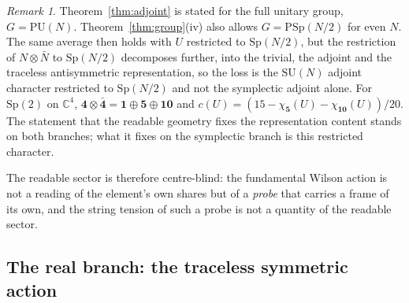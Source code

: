 \documentclass[11pt,a4paper]{article}
\theoremstyle{plain}
\theoremstyle{definition}
\theoremstyle{remark}
\newtheorem*{remark}{Remark}
\newcommand{\C}{\mathbb{C}}
\newcommand{\SU}{\mathrm{SU}}
\newcommand{\PU}{\mathrm{PU}}
\newcommand{\PSp}{\mathrm{PSp}}
\newcommand{\Sp}{\mathrm{Sp}}
\begin{document}
\begin{remark}
Theorem~\ref{thm:adjoint} is stated for the full unitary group, $G=\PU(N)$. Theorem~\ref{thm:group}(iv) also allows $G=\PSp(N/2)$ for even $N$. The same average then holds with $U$ restricted to $\Sp(N/2)$, but the restriction of $N\otimes\bar N$ to $\Sp(N/2)$ decomposes further, into the trivial, the adjoint and the traceless antisymmetric representation, so the loss is the $\SU(N)$ adjoint character restricted to $\Sp(N/2)$ and not the symplectic adjoint alone. For $\Sp(2)$ on $\C^4$, $\mathbf4\otimes\bar{\mathbf4}=\mathbf1\oplus\mathbf5\oplus\mathbf{10}$ and $c(U)=(15-\chi_{\mathbf5}(U)-\chi_{\mathbf{10}}(U))/20$. The statement that the readable geometry fixes the representation content stands on both branches; what it fixes on the symplectic branch is this restricted character.
\end{remark}

The readable sector is therefore centre-blind: the fundamental Wilson action is not a reading of the element's own shares but of a \emph{probe} that carries a frame of its own, and the string tension of such a probe is not a quantity of the readable sector.

\subsection{The real branch: the traceless symmetric action}
\end{document}
